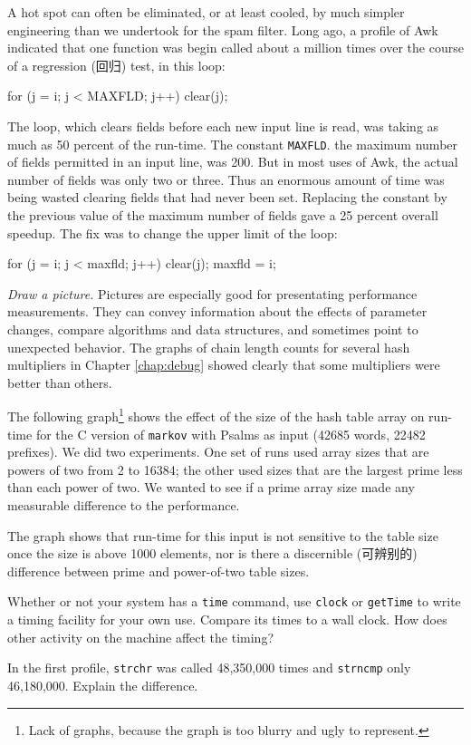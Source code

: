 A hot spot can often be eliminated, or at least cooled, by much simpler
engineering than we undertook for the spam filter. Long ago, a profile of
Awk indicated that one function was begin called about a million times over
the course of a regression (回归) test, in this loop:
\begin{badcode}
    for (j = i; j < MAXFLD; j++)
        clear(j);
\end{badcode}
The loop, which clears fields before each new input line is read, was
taking as much as 50 percent of the run-time. The constant \verb'MAXFLD'.
the maximum number of fields permitted in an input line, was 200. But in
most uses of Awk, the actual number of fields was only two or three. Thus
an enormous amount of time was being wasted clearing fields that had never
been set. Replacing the constant by the previous value of the maximum
number of fields gave a 25 percent overall speedup. The fix was to change
the upper limit of the loop:
\begin{wellcode}
    for (j = i; j < maxfld; j++)
        clear(j);
    maxfld = i;
\end{wellcode}

\emph{Draw a picture.} Pictures are especially good for presentating
performance measurements. They can convey information about the effects of
parameter changes, compare algorithms and data structures, and sometimes
point to unexpected behavior. The graphs of chain length counts for several
hash multipliers in Chapter \ref{chap:debug} showed clearly  that some
multipliers were better than others.

The following graph\footnote{Lack of graphs, because the graph is too
    blurry and ugly to represent.} shows the effect of the size of the hash
table array on run-time for the C version of \verb'markov' with Psalms as
input (42685 words, 22482 prefixes). We did two experiments. One set of
runs used array sizes that are powers of two from 2 to 16384; the other
used sizes that are the largest prime less than each power of two. We
wanted to see if a prime array size made any measurable difference to the
performance.

The graph shows that run-time for this input is not sensitive to the table
size once the size is above 1000 elements, nor is there a discernible
(可辨别的) difference between prime and power-of-two table sizes.

\begin{exercise}
    Whether or not your system has a \verb'time' command, use \verb'clock'
    or \verb'getTime' to write a timing facility for your own use. Compare
    its times to a wall clock. How does other activity on the machine
    affect the timing?
\end{exercise}
\begin{exercise}
    In the first profile, \verb'strchr' was called 48,350,000 times and
    \verb'strncmp' only 46,180,000. Explain the difference.
\end{exercise}

